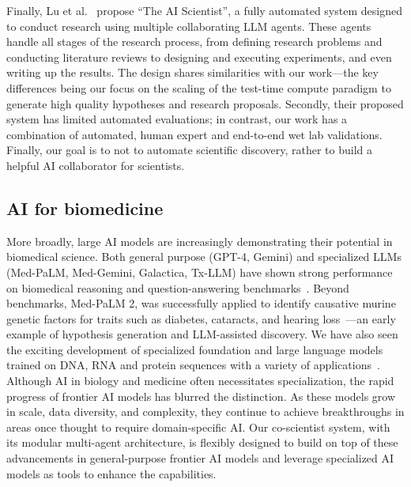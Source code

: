 Finally, Lu et al.~\cite{lu2024ai} propose ``The AI Scientist'', a fully automated system designed to conduct research using multiple collaborating LLM agents. These agents handle all stages of the research process, from defining research problems and conducting literature reviews to designing and executing experiments, and even writing up the results. The design shares similarities with our work---the key differences being our focus on the scaling of the test-time compute paradigm to generate high quality hypotheses and research proposals. Secondly, their proposed system has limited automated evaluations; in contrast, our work has a combination of automated, human expert and end-to-end wet lab validations. Finally, our goal is to not to automate scientific discovery, rather to build a helpful AI collaborator for scientists.

\subsection{AI for biomedicine}
More broadly, large AI models are increasingly demonstrating their potential in biomedical science. Both general purpose (GPT-4, Gemini) and specialized LLMs (Med-PaLM, Med-Gemini, Galactica, Tx-LLM) have shown strong performance on biomedical reasoning and question-answering benchmarks~\citep{team2023gemini, achiam2023gpt, singhal2022large, saab2024capabilities, taylor2022galactica, chaves2024tx}. Beyond benchmarks, Med-PaLM 2, was successfully applied to identify causative murine genetic factors for traits such as diabetes, cataracts, and hearing loss~\cite{tu2023genetic}---an early example of hypothesis generation and LLM-assisted discovery. We have also seen the exciting development of specialized foundation and large language models trained on DNA, RNA and protein sequences with a variety of applications~\citep{nguyen2024sequence, lin2023evolutionary, ruffolo2024design, shaw2024protex}. Although AI in biology and medicine often necessitates specialization, the rapid progress of frontier AI models has blurred the distinction. As these models grow in scale, data diversity, and complexity, they continue to achieve breakthroughs in areas once thought to require domain-specific AI. Our co-scientist system, with its modular multi-agent architecture, is flexibly designed to build on top of these advancements in general-purpose frontier AI models and leverage specialized AI models as tools to enhance the capabilities.
 
